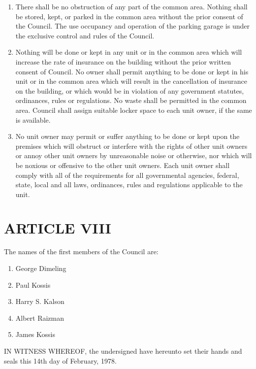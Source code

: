 \documentclass[
  14pt,
]{book}
\providecommand{\tightlist}{%
  \setlength{\itemsep}{0pt}\setlength{\parskip}{0pt}}
\begin{document}
\begin{enumerate}
\def\labelenumi{(\Alph{enumi})}
\item
  There shall be no obstruction of any part of the common area. Nothing shall be stored, kept, or parked in the common area without the prior consent of the Council. The use occupancy and operation of the parking garage is under the exclusive control and rules of the Council.
\item
  Nothing will be done or kept in any unit or in the common area which will increase the rate of insurance on the building without the prior written consent of Council. No owner shall permit anything to be done or kept in his unit or in the common area which will result in the cancellation of insurance on the building, or which would be in violation of any government statutes, ordinances, rules or regulations. No waste shall be permitted in the common area. Council shall assign suitable locker space to each unit owner, if the same is available.
\item
  No unit owner may permit or suffer anything to be done or kept upon the premises which will obstruct or interfere with the rights of other unit owners or annoy other unit owners by unreasonable noise or otherwise, nor which will be noxious or offensive to the other unit owners. Each unit owner shall comply with all of the requirements for all governmental agencies, federal, state, local and all laws, ordinances, rules and regulations applicable to the unit.
\end{enumerate}

\hypertarget{article-viii}{%
\section*{ARTICLE VIII}\label{article-viii}}

The names of the first members of the Council are:

\begin{enumerate}
\def\labelenumi{\arabic{enumi}.}
\tightlist
\item
  George Dimeling
\item
  Paul Kossis
\item
  Harry S. Kalson
\item
  Albert Raizman
\item
  James Kossis
\end{enumerate}

IN WITNESS WHEREOF, the undersigned have hereunto set their hands and seals this 14th day of February, 1978.
\end{document}
